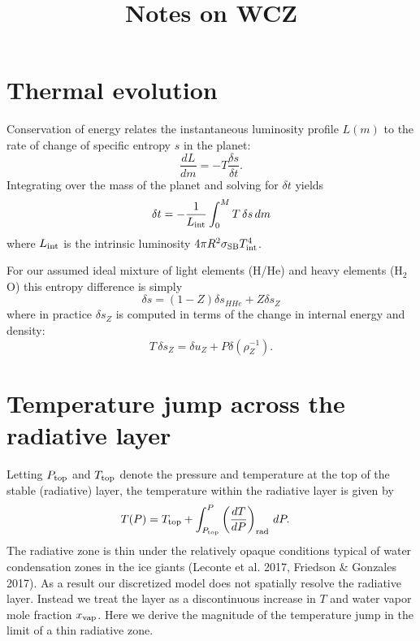 \documentclass[12pt]{article}
\begin{document}
\title{Notes on WCZ}
\maketitle

\section{Thermal evolution}
Conservation of energy relates the instantaneous luminosity profile $L(m)$ to the rate of change of specific entropy $s$ in the planet:
\begin{equation}
  \frac{dL}{dm}=-T\frac{\delta s}{\delta t}.
\end{equation}
Integrating over the mass of the planet and solving for $\delta t$ yields
\begin{equation}
\delta t=-\frac{1}{L_{\rm int}}\int_0^M T\,\delta s\,dm
\end{equation}
where $L_{\rm int}$ is the intrinsic luminosity $4\pi R^2\sigma_{\rm SB}T_{\rm int}^4$.

For our assumed ideal mixture of light elements (H/He) and heavy elements (H$_2$O) this entropy difference is simply
\begin{equation}
  \delta s = (1-Z)\delta s_{HHe} + Z\delta s_Z
\end{equation}
where in practice $\delta s_Z$ is computed in terms of the change in internal energy and density:
\begin{equation}
  T\,\delta s_Z = \delta u_Z + P\delta\left(\rho_Z^{-1}\right).
\end{equation}

\section{Temperature jump across the radiative layer}
Letting $P_{\rm top}$ and $T_{\rm top}$ denote the pressure and temperature at the top of the stable (radiative) layer, the temperature within the radiative layer is given by
\begin{align}
T(P) &= T_{\rm top} + \int_{P_{\rm top}}^P\left(\frac{dT}{dP}\right)_{\rm rad}\,d P. \label{eq.t_of_p}
\end{align}
The radiative zone is thin under the relatively opaque conditions typical of water condensation zones in the ice giants (Leconte et al. 2017, Friedson \& Gonzales 2017). As a result our discretized model does not spatially resolve the radiative layer. Instead we treat the layer as a discontinuous increase in $T$ and water vapor mole fraction $x_{\rm vap}$. Here we derive the magnitude of the temperature jump in the limit of a thin radiative zone.
\end{document}

